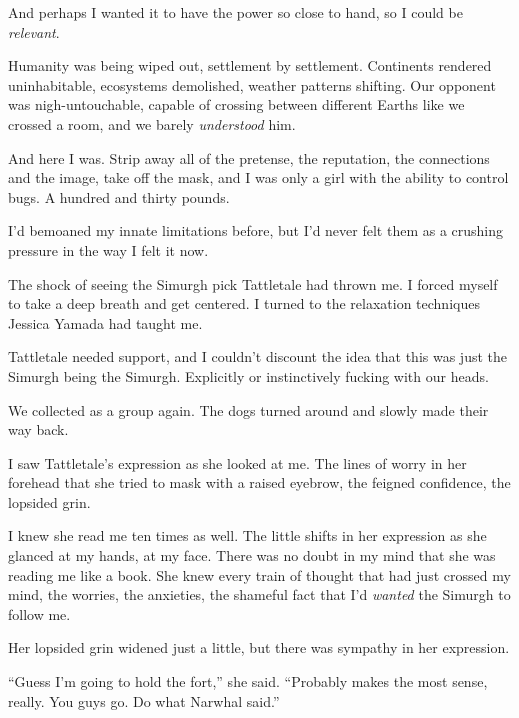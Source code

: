 And perhaps I wanted it to have the power so close to hand, so I could be \emph{relevant}.



Humanity was being wiped out, settlement by settlement.  Continents rendered uninhabitable, ecosystems demolished, weather patterns shifting.  Our opponent was nigh-untouchable, capable of crossing between different Earths like we crossed a room, and we barely \emph{understood} him.



And here I was.  Strip away all of the pretense, the reputation, the connections and the image, take off the mask, and I was only a girl with the ability to control bugs.  A hundred and thirty pounds.



I'd bemoaned my innate limitations before, but I'd never felt them as a crushing pressure in the way I felt it now.



The shock of seeing the Simurgh pick Tattletale had thrown me.  I forced myself to take a deep breath and get centered.  I turned to the relaxation techniques Jessica Yamada had taught me.



Tattletale needed support, and I couldn't discount the idea that this was just the Simurgh being the Simurgh.  Explicitly or instinctively fucking with our heads.



We collected as a group again.  The dogs turned around and slowly made their way back.



I saw Tattletale's expression as she looked at me.  The lines of worry in her forehead that she tried to mask with a raised eyebrow, the feigned confidence, the lopsided grin.



I knew she read me ten times as well.  The little shifts in her expression as she glanced at my hands, at my face.  There was no doubt in my mind that she was reading me like a book.  She knew every train of thought that had just crossed my mind, the worries, the anxieties, the shameful fact that I'd \emph{wanted} the Simurgh to follow me.



Her lopsided grin widened just a little, but there was sympathy in her expression.



``Guess I'm going to hold the fort,'' she said.  ``Probably makes the most sense, really.  You guys go.  Do what Narwhal said.''



